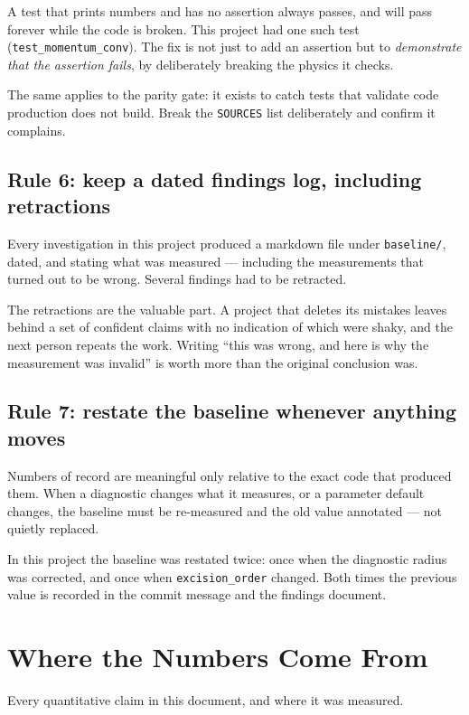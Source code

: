 A test that prints numbers and has no assertion always passes, and will pass
forever while the code is broken. This project had one such test
(\texttt{test\_momentum\_conv}). The fix is not just to add an assertion but to
\emph{demonstrate that the assertion fails}, by deliberately breaking the physics it
checks.

The same applies to the parity gate: it exists to catch tests that validate
code production does not build. Break the \texttt{SOURCES} list deliberately
and confirm it complains.

\subsection{Rule 6: keep a dated findings log, including retractions}

Every investigation in this project produced a markdown file under
\texttt{baseline/}, dated, and stating what was measured --- including the
measurements that turned out to be wrong. Several findings had to be retracted.

The retractions are the valuable part. A project that deletes its mistakes
leaves behind a set of confident claims with no indication of which were
shaky, and the next person repeats the work. Writing ``this was wrong, and
here is why the measurement was invalid'' is worth more than the original
conclusion was.

\subsection{Rule 7: restate the baseline whenever anything moves}

Numbers of record are meaningful only relative to the exact code that produced
them. When a diagnostic changes what it measures, or a parameter default
changes, the baseline must be re-measured and the old value annotated --- not
quietly replaced.

In this project the baseline was restated twice: once when the diagnostic
radius was corrected, and once when \texttt{excision\_order} changed. Both times
the previous value is recorded in the commit message and the findings document.

\section{Where the Numbers Come From}
\label{ch:numbers}

Every quantitative claim in this document, and where it was measured.

